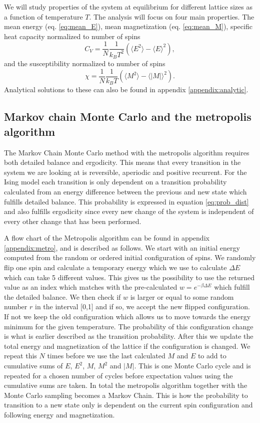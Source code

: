 \documentclass[english,notitlepage,reprint,nofootinbib]{revtex4-1}  %
\begin{document}
We will study properties of the system at equilibrium for different lattice sizes as a function of temperature $T$. The analysis will focus on four main properties. The mean energy (eq. \ref{eq:mean_E}), mean magnetization (eq. \ref{eq:mean_M}), specific heat capacity normalized to number of spins
\begin{equation}
    C_V = \frac{1}{N} \frac{1}{k_B T^2} \left( \langle E^2 \rangle - \langle E \rangle^2 \right),
\end{equation}
and the susceptibility normalized to number of spins
\begin{equation}
    \chi = \frac{1}{N} \frac{1}{k_B T} \left( \langle M^2 \rangle - \langle |M| \rangle^2 \right).
\end{equation}
Analytical solutions to these can also be found in appendix \ref{appendix:analytic}.


\subsection*{Markov chain Monte Carlo and the metropolis algorithm}
The Markov Chain Monte Carlo method with the metropolis algorithm requires both detailed balance and ergodicity. This means that every transition in the system we are looking at is reversible, aperiodic and positive recurrent. For the Ising model each transition is only dependent on a transition probability calculated from an energy difference between the previous and new state which fulfills detailed balance. This probability is expressed in equation \ref{eq:prob_dist} and also fulfills ergodicity since every new change of the system is independent of every other change that has been performed.

A flow chart of the Metropolis algorithm can be found in appendix \ref{appendix:metro}, and is described as follows. We start with an initial energy computed from the random or ordered initial configuration of spins. We randomly flip one spin and calculate a temporary energy which we use to calculate $\Delta E$ which can take 5 different values. This gives us the possibility to use the returned value as an index which matches with the pre-calculated $w= e^{-\beta \Delta E}$ which fulfill the detailed balance. We then check if $w$ is larger or equal to some random number $r$ in the interval [0,1] and if so, we accept the new flipped configuration. If not we keep the old configuration which allows us to move towards the energy minimum for the given temperature. The probability of this configuration change is what is earlier described as the transition probability. After this we update the total energy and magnetization of the lattice if the configuration is changed. We repeat this $N$ times before we use the last calculated $M$ and $E$ to add to cumulative sums of $E$, $E^2$, $M$, $M^2$ and $|M|$. This is one Monte Carlo cycle and is repeated for a chosen number of cycles before expectation values using the cumulative sums are taken. In total the metropolis algorithm together with the Monte Carlo sampling becomes a Markov Chain. This is how the probability to transition to a new state only is dependent on the current spin configuration and following energy and magnetization.
\end{document}
